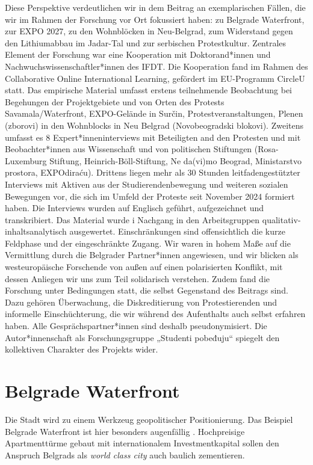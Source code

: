 \documentclass[
  ngerman,
]{agujournal2019}
\begin{document}
Diese Perspektive verdeutlichen wir in dem Beitrag an exemplarischen
Fällen, die wir im Rahmen der Forschung vor Ort fokussiert haben: zu
Belgrade Waterfront, zur EXPO 2027, zu den Wohnblöcken in Neu-Belgrad,
zum Widerstand gegen den Lithiumabbau im Jadar-Tal und zur serbischen
Protestkultur. Zentrales Element der Forschung war eine Kooperation mit
Doktorand*innen und Nachwuchswissenschaftler*innen des IFDT. Die
Kooperation fand im Rahmen des Collaborative Online International
Learning, gefördert im EU-Programm CircleU statt. Das empirische
Material umfasst erstens teilnehmende Beobachtung bei Begehungen der
Projektgebiete und von Orten des Protests Savamala/Waterfront,
EXPO-Gelände in Surčin, Protestveranstaltungen, Plenen (zborovi) in den
Wohnblocks in Neu Belgrad (Novobeogradski blokovi). Zweitens umfasst es
8 Expert*inneninterviews mit Beteiligten and den Protesten und mit
Beobachter*innen aus Wissenschaft und von politischen Stiftungen
(Rosa-Luxemburg Stiftung, Heinrich-Böll-Stiftung, Ne da(vi)mo Beograd,
Ministarstvo prostora, EXPOdiraću). Drittens liegen mehr als 30 Stunden
leitfadengestützter Interviews mit Aktiven aus der Studierendenbewegung
und weiteren sozialen Bewegungen vor, die sich im Umfeld der Proteste
seit November 2024 formiert haben. Die Interviews wurden auf Englisch
geführt, aufgezeichnet und transkribiert. Das Material wurde i Nachgang
in den Arbeitsgruppen qualitativ-inhaltsanalytisch ausgewertet.
Einschränkungen sind offensichtlich die kurze Feldphase und der
eingeschränkte Zugang. Wir waren in hohem Maße auf die Vermittlung durch
die Belgrader Partner*innen angewiesen, und wir blicken als
westeuropäische Forschende von außen auf einen polarisierten Konflikt,
mit dessen Anliegen wir uns zum Teil solidarisch verstehen. Zudem fand
die Forschung unter Bedingungen statt, die selbst Gegenstand des
Beitrags sind. Dazu gehören Überwachung, die Diskreditierung von
Protestierenden und informelle Einschüchterung, die wir während des
Aufenthalts auch selbst erfahren haben. Alle Gesprächspartner*innen sind
deshalb pseudonymisiert. Die Autor*innenschaft als Forschungsgruppe
„Studenti pobeđuju`` spiegelt den kollektiven Charakter des Projekts
wider.

\section{Belgrade Waterfront}\label{belgrade-waterfront}

Die Stadt wird zu einem Werkzeug geopolitischer Positionierung. Das
Beispiel Belgrade Waterfront ist hier besonders augenfällig .
Hochpreisige Apartmenttürme gebaut mit internationalem Investmentkapital
sollen den Anspruch Belgrads als \emph{world class city} auch baulich
zementieren.
\end{document}
